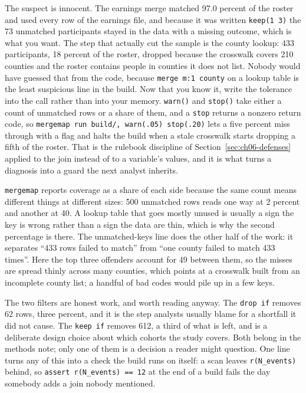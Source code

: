\documentclass[
    a4paper,
    fontsize=10pt,
    twoside=true,
    numbers=noenddot,
]{kaobook}
\begin{document}
The suspect is innocent. The earnings merge matched 97.0 percent of the roster and used every row of the earnings file, and because it was written \texttt{keep(1 3)} the 73 unmatched participants stayed in the data with a missing outcome, which is what you want. The step that actually cut the sample is the county lookup: 433 participants, 18 percent of the roster, dropped because the crosswalk covers 210 counties and the roster contains people in counties it does not list. Nobody would have guessed that from the code, because \texttt{merge m:1 county} on a lookup table is the least suspicious line in the build. Now that you know it, write the tolerance into the call rather than into your memory. \texttt{warn()} and \texttt{stop()} take either a count of unmatched rows or a share of them, and a \texttt{stop} returns a nonzero return code, so \texttt{mergemap run build/, warn(.05) stop(.20)} lets a five percent miss through with a flag and halts the build when a stale crosswalk starts dropping a fifth of the roster. That is the rulebook discipline of Section~\ref{sec:ch06-defenses} applied to the join instead of to a variable's values, and it is what turns a diagnosis into a guard the next analyst inherits.

\texttt{mergemap} reports coverage as a share of each side because the same count means different things at different sizes: 500 unmatched rows reads one way at 2 percent and another at 40. A lookup table that goes mostly unused is usually a sign the key is wrong rather than a sign the data are thin, which is why the second percentage is there. The unmatched-keys line does the other half of the work: it separates \enquote{433 rows failed to match} from \enquote{one county failed to match 433 times}. Here the top three offenders account for 49 between them, so the misses are spread thinly across many counties, which points at a crosswalk built from an incomplete county list; a handful of bad codes would pile up in a few keys.

The two filters are honest work, and worth reading anyway. The \texttt{drop if} removes 62 rows, three percent, and it is the step analysts usually blame for a shortfall it did not cause. The \texttt{keep if} removes 612, a third of what is left, and is a deliberate design choice about which cohorts the study covers. Both belong in the methods note; only one of them is a decision a reader might question. One line turns any of this into a check the build runs on itself: a scan leaves \texttt{r(N\_events)} behind, so \texttt{assert r(N\_events) == 12} at the end of a build fails the day somebody adds a join nobody mentioned.
\end{document}
